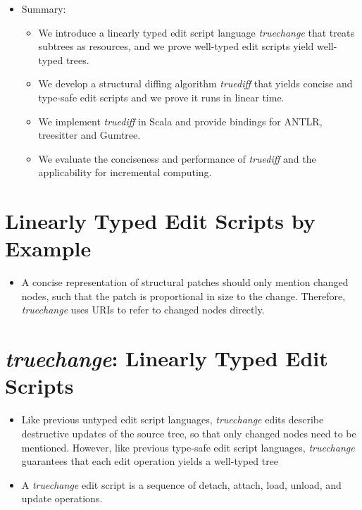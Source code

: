 \begin{itemize}
\begin{itemize}
    \end{itemize}
    \item Summary:
    \begin{itemize}
        \item We introduce a linearly typed edit script language \textit{truechange} that treats subtrees as resources, and we prove well-typed edit scripts yield well-typed trees.
        \item We develop a structural diffing algorithm \textit{truediff} that yields concise and type-safe edit scripts and we prove it runs in linear time. 
        \item We implement \textit{truediff} in Scala and provide bindings for ANTLR, treesitter and Gumtree.
        \item We evaluate the conciseness and performance of \textit{truediff} and the applicability for incremental computing.
    \end{itemize}
\end{itemize}

\section{Linearly Typed Edit Scripts by Example}
\begin{itemize}
    \item A concise representation of structural patches should only mention changed nodes, such that the patch is proportional in size to the change. Therefore, \textit{truechange} uses URIs to refer to changed nodes directly.
\end{itemize}

\section{\textit{truechange}: Linearly Typed Edit Scripts}
\begin{itemize}
    \item Like previous untyped edit script languages, \textit{truechange} edits describe destructive updates of the source tree, so that only changed nodes need to be mentioned. However, like previous type-safe edit script languages, \textit{truechange} guarantees that each edit operation yields a well-typed tree
    \item A \textit{truechange} edit script is a sequence of detach, attach, load, unload, and update operations.
\end{itemize}

\newpage

